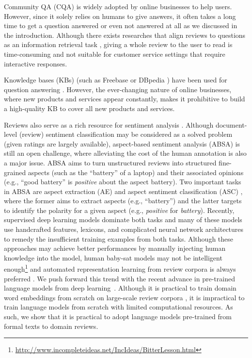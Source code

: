 Community QA (CQA) is widely adopted by online businesses \cite{mcauley2016addressing} to help users.
However, since it solely relies on humans to give answers, it often takes a long time to get a question answered or even not answered at all as we discussed in the introduction.
Although there exists researches that align reviews to questions as an information retrieval task \cite{mcauley2016addressing,yu2018aware}, giving a whole review to the user to read is time-consuming and not suitable for customer service settings that require interactive responses.

Knowledge bases (KBs) (such as Freebase \cite{dong2015question,xu2016question,yao2014information} or DBpedia \cite{lopez2010scaling,unger2012template}) have been used for question answering \cite{yu2018aware}.
However, the ever-changing nature of online businesses, where new products and services appear constantly, makes it prohibitive to build a high-quality KB to cover all new products and services.

Reviews also serve as a rich resource for sentiment analysis \cite{pang2002thumbs,hu2004mining,liu2012sentiment,liu2015sentiment}.
Although document-level (review) sentiment classification may be considered as a solved problem (given ratings are largely available), aspect-based sentiment analysis (ABSA) is still an open challenge, where alleviating the cost of the human annotation is also a major issue.
ABSA aims to turn unstructured reviews into structured fine-grained aspects (such as the ``battery'' of a laptop) and their associated opinions (e.g., ``good battery'' is \emph{positive} about the aspect battery).
Two important tasks in ABSA are aspect extraction (AE) and aspect sentiment classification (ASC) \cite{hu2004mining}, where the former aims to extract aspects (e.g., ``battery'') and the latter targets to identify the polarity for a given aspect (e.g., \emph{positive} for \emph{battery}).
Recently, supervised deep learning models dominate both tasks \cite{wang2016recursive,wang2017coupled,xu_acl2018,tang2016aspect,he2018exploiting} and many of these models use handcrafted features, lexicons, and complicated neural network architectures to remedy the insufficient training examples from both tasks.
Although these approaches may achieve better performances by manually injecting human knowledge into the model, human baby-sat models may not be intelligent enough\footnote{\url{http://www.incompleteideas.net/IncIdeas/BitterLesson.html}} and automated representation learning from review corpora is always preferred \cite{xu_acl2018,he2018exploiting}.
We push forward this trend with the recent advance in pre-trained language models from deep learning~\cite{peters2018deep,howard2018universal,devlin2018bert,radford2018improving,radford2018lang}. 
Although it is practical to train domain word embeddings from scratch on large-scale review corpora \cite{xu_acl2018}, it is impractical to train language models from scratch with limited computational resources.
As such, we show that it is practical to adopt language models pre-trained from formal texts to domain reviews.

